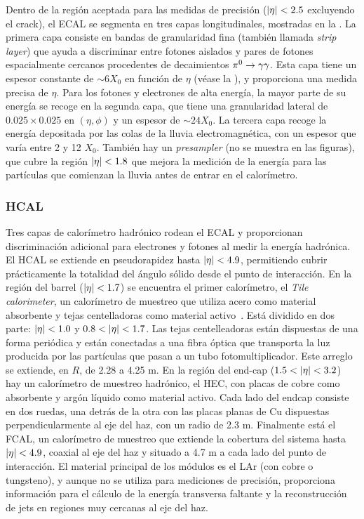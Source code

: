 Dentro de la región aceptada para las medidas de precisión (\(|\eta|<2.5\) excluyendo el crack), el \ac{ECAL} se segmenta en tres capas longitudinales, mostradas en la \Fig{\ref{fig:atlas:atlas:cals:ecal:ecal_cells}}.
La primera capa consiste en bandas de granularidad fina (también llamada \textit{strip layer}) que ayuda a discriminar entre fotones aislados y pares de fotones espacialmente cercanos procedentes de decaimientos \(\pi^{0}\rightarrow\gamma\gamma\). Esta capa tiene un espesor constante de \(\sim 6 X_0\) en función de \(\eta\) (véase la \Fig{\ref{fig:atlas:atlas:cals:ecal:ecal_radiation_length}}), y proporciona una medida precisa de \(\eta\).
Para los fotones y electrones de alta energía, la mayor parte de su energía se recoge en la segunda capa, que tiene una granularidad lateral de \(0.025 \times 0.025\) en \((\eta, \phi)\) y un espesor de \(\sim 24 X_0\).
La tercera capa recoge la energía depositada por las colas de la lluvia electromagnética, con un espesor que varía entre 2 y 12 \(X_0\).
También hay un \textit{presampler} (no se muestra en las figuras), que cubre la región \(|\eta|<1.8\) que mejora la medición de la energía para las partículas que comienzan la lluvia antes de entrar en el calorímetro.




\subsubsection{\acf{HCAL}}



Tres capas de calorímetro hadrónico rodean el \ac{ECAL} y proporcionan discriminación adicional para electrones y fotones al medir la energía hadrónica. El \ac{HCAL} se extiende en pseudorapidez hasta \(|\eta|<4.9\), permitiendo cubrir prácticamente la totalidad del ángulo sólido desde el punto de interacción. En la región del barrel (\(|\eta|<1.7\)) se encuentra el primer calorímetro, el \textit{Tile calorimeter}, un calorímetro de muestreo que utiliza acero como material absorbente y tejas centelladoras como material activo~\cite{ATLAS-Tile-TDR}. Está dividido en dos parte: \(|\eta|<1.0\) y \(0.8<\abseta<1.7\). Las tejas centelleadoras est\'an dispuestas de una forma periódica y están conectadas a una fibra óptica que transporta la luz producida por las partículas que pasan a un tubo fotomultiplicador. Este arreglo se extiende, en \(R\), de 2.28 a 4.25 m. En la región del end-cap (\(1.5<\abseta<3.2\)) hay un calorímetro de muestreo hadrónico, el \acf{HEC}, con placas de cobre como absorbente y argón líquido como material activo. Cada lado del endcap consiste en dos ruedas, una detrás de la otra con las placas planas de Cu dispuestas perpendicularmente al eje del haz, con un radio de 2.3 m. Finalmente está el \ac{FCAL}, un calorímetro de muestreo que extiende la cobertura del sistema hasta \(|\eta|<4.9\), coaxial al eje del haz y situado a 4.7 m a cada lado del punto de interacción. El material principal de los módulos es el \ac{LAr} (con cobre o tungsteno), y aunque no se utiliza para mediciones de precisión, proporciona información para el cálculo de la energía transversa faltante y la reconstrucción de jets en regiones muy cercanas al eje del haz.

